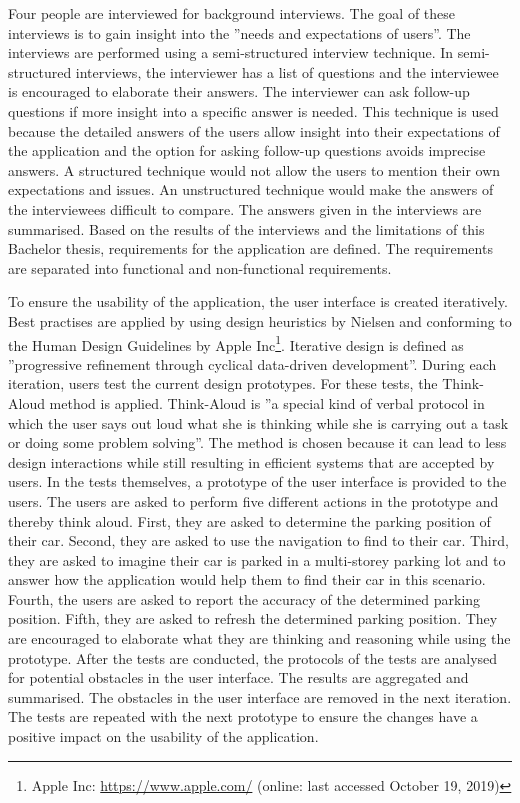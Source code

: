 Four people are interviewed for background interviews. The goal of these interviews is to gain insight into the ''needs and expectations of users''. The interviews are performed using a semi-structured interview technique. In semi-structured interviews, the interviewer has a list of questions and the interviewee is encouraged to elaborate their answers. The interviewer can ask follow-up questions if more insight into a specific answer is needed. This technique is used because the detailed answers of the users allow insight into their expectations of the application and the option for asking follow-up questions avoids imprecise answers. A structured technique would not allow the users to mention their own expectations and issues. An unstructured technique would make the answers of the interviewees difficult to compare. The answers given in the interviews are summarised. Based on the results of the interviews and the limitations of this Bachelor thesis, requirements for the application are defined. The requirements are separated into functional and non-functional requirements. \cite{Abras2004} \cite{wilson2013interview}

To ensure the usability of the application, the user interface is created iteratively. Best practises are applied by using design heuristics by Nielsen and conforming to the Human Design Guidelines by Apple Inc\footnote{Apple Inc: \url{https://www.apple.com/} (online: last accessed October 19, 2019)}. Iterative design is defined as ''progressive refinement through cyclical data-driven development''. During each iteration, users test the current design prototypes. For these tests, the Think-Aloud method is applied. Think-Aloud is ''a special kind of verbal protocol in which the user says out loud what she is thinking while she is carrying out a task or doing some problem solving''. The method is chosen because it can lead to less design interactions while still resulting in efficient systems that are accepted by users. In the tests themselves, a prototype of the user interface is provided to the users. The users are asked to perform five different actions in the prototype and thereby think aloud. First, they are asked to determine the parking position of their car. Second, they are asked to use the navigation to find to their car. Third, they are asked to imagine their car is parked in a multi-storey parking lot and to answer how the application would help them to find their car in this scenario. Fourth, the users are asked to report the accuracy of the determined parking position. Fifth, they are asked to refresh the determined parking position. They are encouraged to elaborate what they are thinking and reasoning while using the prototype. After the tests are conducted, the protocols of the tests are analysed for potential obstacles in the user interface. The results are aggregated and summarised. The obstacles in the user interface are removed in the next iteration. The tests are repeated with the next prototype to ensure the changes have a positive impact on the usability of the application. \cite{Abras2004} \cite{goodman2012observing} \cite{nielsen1994usability} \cite{heurisitcNielsen} \cite{apple:interfaceguidliines} \cite{jaspers2004think} 

